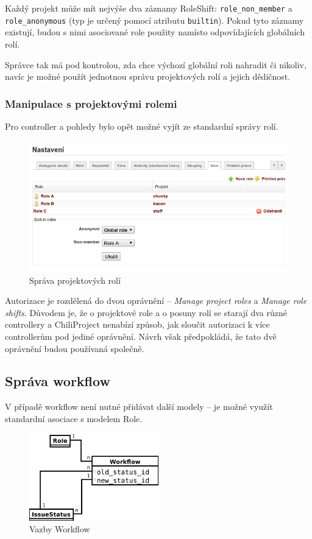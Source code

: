 \documentclass[thesis=B,czech]{FITthesis}[2012/05/02]
\begin{document}
Každý projekt může mít nejvýše dva záznamy RoleShift:
\lstinline!role_non_member! a \lstinline!role_anonymous! (typ je určený
pomocí atributu \lstinline!builtin!). Pokud tyto záznamy existují, budou
s nimi asociované role použity namísto odpovídajících globálních rolí.

Správce tak má pod kontrolou, zda chce výchozí globální roli nahradit či
nikoliv, navíc je možné použít jednotnou správu projektových rolí a
jejich dědičnost.

\subsubsection{Manipulace s projektovými rolemi}

Pro controller a pohledy bylo opět možné vyjít ze standardní správy
rolí.

\begin{figure}[tbp]
\centering
\includegraphics[width=1\textwidth]{role-gui1.png}
\caption{Správa projektových rolí}
\end{figure}

Autorizace je rozdělená do dvou oprávnění -- \emph{Manage project roles} a
\emph{Manage role shifts}. Důvodem je, že o projektové role a o posuny rolí
se starají dva různé controllery a ChiliProject nenabízí způsob, jak
sloučit autorizaci k více controllerům pod jediné oprávnění. Návrh však
předpokládá, že tato dvě oprávnění budou používaná společně.

\subsection{Správa workflow}

V případě \gls{workflow} není nutné přidávat další modely -- je možné
využít standardní asociace s modelem Role.

\begin{figure}[htbp]
\centering
\includegraphics[width=0.5\textwidth]{role-er3.pdf}
\caption{Vazby Workflow}
\label{fig:Workflow}
\end{figure}
\end{document}
